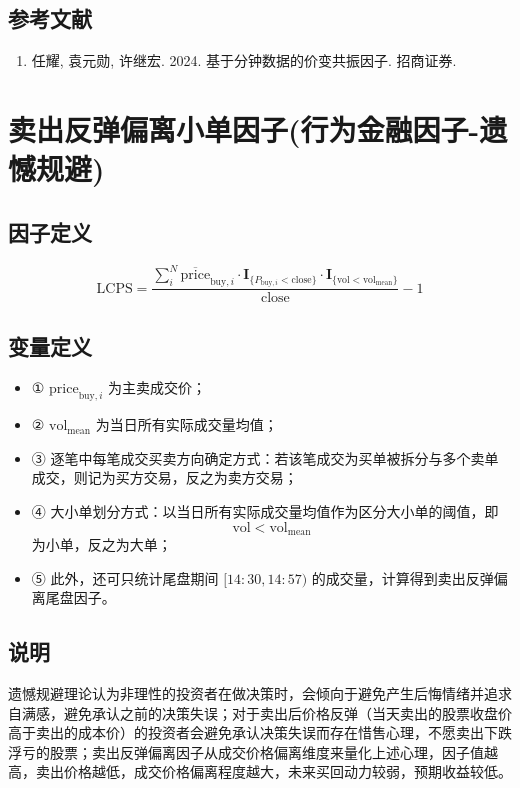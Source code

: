 \documentclass{article}
\begin{document}
\subsection{参考文献}
\begin{enumerate}
    \item 任耀, 袁元勋, 许继宏. 2024. 基于分钟数据的价变共振因子. 招商证券.
\end{enumerate}

\section{卖出反弹偏离小单因子(行为金融因子-遗憾规避)}

\subsection{因子定义}
\begin{equation}
    \mathrm{LCPS} = \frac{\sum_{i}^{N} \overline{\mathrm{price}}_{\mathrm{buy},i} \cdot \mathbf{I}_{\{P_{\mathrm{buy},i} < \mathrm{close}\}} \cdot \mathbf{I}_{\{\mathrm{vol} < \mathrm{vol}_{\mathrm{mean}}\}}}{\mathrm{close} } - 1
\end{equation}

\subsection{变量定义}
\begin{itemize}
    \item ① \( \mathrm{price}_{\mathrm{buy},i} \) 为主卖成交价；
    \item ② \( \mathrm{vol}_{\mathrm{mean}} \) 为当日所有实际成交量均值；
    \item ③ 逐笔中每笔成交买卖方向确定方式：若该笔成交为买单被拆分与多个卖单成交，则记为买方交易，反之为卖方交易；
    \item ④ 大小单划分方式：以当日所有实际成交量均值作为区分大小单的阈值，即
        \begin{equation*}
            \mathrm{vol} < \mathrm{vol}_{\mathrm{mean}}
        \end{equation*}
        为小单，反之为大单；
    \item ⑤ 此外，还可只统计尾盘期间 \([14:30,14:57)\) 的成交量，计算得到卖出反弹偏离尾盘因子。
\end{itemize}

\subsection{说明}
遗憾规避理论认为非理性的投资者在做决策时，会倾向于避免产生后悔情绪并追求自满感，避免承认之前的决策失误；对于卖出后价格反弹（当天卖出的股票收盘价高于卖出的成本价）的投资者会避免承认决策失误而存在惜售心理，不愿卖出下跌浮亏的股票；卖出反弹偏离因子从成交价格偏离维度来量化上述心理，因子值越高，卖出价格越低，成交价格偏离程度越大，未来买回动力较弱，预期收益较低。
\end{document}
